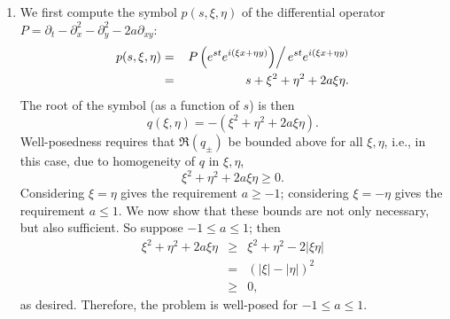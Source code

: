 \documentclass{article}
\begin{document}
\begin{enumerate}
\begin{enumerate}
\item We first compute the symbol \(p(s,\xi,\eta)\) of the differential operator \(P = \partial_t - \partial_x^2 - \partial_y^2 - 2a\partial_{xy}\):
\begin{eqnarray*}
p(s,\xi,\eta)
& = & \left. P \left( e^{st} e^{i(\xi x + \eta y)} \right) \right/ e^{st} e^{i(\xi x + \eta y)} \\
& = & s + \xi^2 + \eta^2 + 2a\xi\eta.
\end{eqnarray*}
The root of the symbol (as a function of \(s\)) is then
\[q(\xi,\eta) = -\left( \xi^2 + \eta^2 + 2a\xi\eta \right).\]
Well-posedness requires that \(\Re \left( q_{\pm} \right)\) be bounded above for all \(\xi,\eta\), i.e., in this case, due to homogeneity of \(q\) in \(\xi,\eta\),
\[\xi^2 + \eta^2 + 2a \xi \eta \geq 0.\]
Considering \(\xi = \eta\) gives the requirement \(a \geq -1\); considering \(\xi = -\eta\) gives the requirement \(a \leq 1\).  We now show that these bounds are not only necessary, but also sufficient.  So suppose \(-1 \leq a \leq 1\); then
\begin{eqnarray*}
\xi^2 + \eta^2 + 2a \xi \eta
& \geq & \xi^2 + \eta^2 - 2 |\xi \eta| \\
&   =  & \left( |\xi| - |\eta| \right)^2 \\
& \geq & 0,
\end{eqnarray*}
as desired.  Therefore, the problem is well-posed for \(-1 \leq a \leq 1\).


\end{enumerate}
\end{enumerate}
\end{document}

